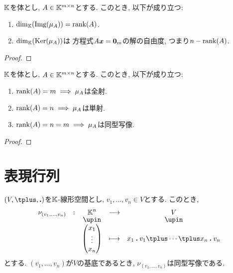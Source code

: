 \begin{cor}
  $\mathbb{K}$を体とし,
  $A\in\mathbb{K}^{m\times n}$とする.
  このとき,
  以下が成り立つ:
  \begin{enumerate}
  \item $\dim_{\mathbb{K}}(\operatorname{Img}(\mu_A))=\operatorname{rank}(A)$.
  \item $\dim_{\mathbb{K}}(\operatorname{Ker}(\mu_A))$は
    方程式$A\boldsymbol{x}=\boldsymbol{0}_m$の解の自由度, つまり$n-\operatorname{rank}(A)$.
  \end{enumerate}
\end{cor}
\begin{proof}\end{proof}

\begin{cor}
  $\mathbb{K}$を体とし,
  $A\in\mathbb{K}^{m\times n}$とする.
  このとき,
  以下が成り立つ:
  \begin{enumerate}
  \item $\operatorname{rank}(A)=m \implies \mu_A$は全射.
  \item $\operatorname{rank}(A)=n \implies \mu_A$は単射.
  \item $\operatorname{rank}(A)=n=m\implies \mu_A$は同型写像.
  \end{enumerate}
\end{cor}
\begin{proof}\end{proof}



\section{表現行列}
\label{sec:repmat:linmap}
$(V,\plus,\act)$を$\mathbb{K}$-線形空間とし, $v_1,\ldots,v_n\in V$とする.
このとき,
\begin{align*}
    \shazo{\nu_{(v_1,\ldots,v_n)}}{\KK^n}{V}
          {\begin{pmatrix}x_1\\\vdots\\x_n\end{pmatrix}}
          {x_1\act v_1\plus \cdots\plus x_n\act v_n}
\end{align*}
とする.
$(v_1,\ldots,v_n)$が$V$の基底であるとき,
$\nu_{(v_1,\ldots,v_n)}$は同型写像である.

